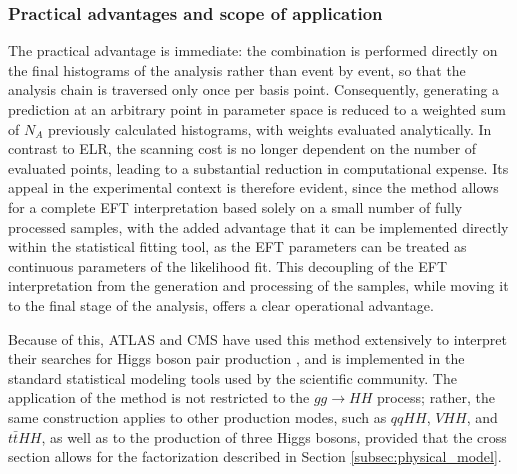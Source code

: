
\subsubsection{Practical advantages and scope of application}
The practical advantage is immediate: the combination is performed directly on the final histograms of the analysis rather than event by event, so that the analysis chain is traversed only once per basis point. Consequently, generating a prediction at an arbitrary point in parameter space is reduced to a weighted sum of $N_A$ previously calculated histograms, with weights evaluated analytically. In contrast to ELR, the scanning cost is no longer dependent on the number of evaluated points, leading to a substantial reduction in computational expense. Its appeal in the experimental context is therefore evident, since the method allows for a complete EFT interpretation based solely on a small number of fully processed samples, with the added advantage that it can be implemented directly within the statistical fitting tool, as the EFT parameters can be treated as continuous parameters of the likelihood fit. This decoupling of the EFT interpretation from the generation and processing of the samples, while moving it to the final stage of the analysis, offers a clear operational advantage.

Because of this, ATLAS and CMS have used this method extensively to interpret their searches for Higgs boson pair production \cite{CMS_combination, ATLAS:2024pov, ATLAS:2025tkn}, and is implemented in the standard statistical modeling tools used by the scientific community. The application of the method is not restricted to the $gg\to HH$ process; rather, the same construction applies to other production modes, such as $qqHH$, $VHH$, and $t\bar{t}HH$, as well as to the production of three Higgs bosons, provided that the cross section allows for the factorization described in Section \ref{subsec:physical_model}.

